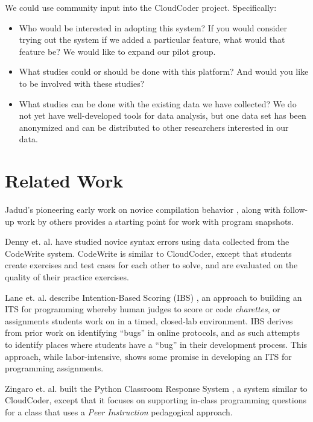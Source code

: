 \documentclass{sig-alternate}
\begin{document}
We could use community input into the CloudCoder project.  Specifically:

\begin{itemize}
\item Who would be interested in adopting this system?  If you would
  consider trying out the system if we added a particular feature,
  what would that feature be?  We would like
  to expand our pilot group.
\item What studies could or should be done with this platform?  And
  would you like to be involved with these studies?
\item What studies can be done with the existing data we have
  collected?  We do not yet have well-developed tools for data
  analysis, but one data set has been anonymized and can be
  distributed to other researchers interested in our data.
\end{itemize}

\section{Related Work}

Jadud's pioneering early work on novice compilation behavior
\cite{Jadud:2006:MTE:1151588.1151600}, along with follow-up work by
others \cite{Norris:2008:CCQ:1384271.1384284} provides a starting point for
work with program snapshots.

Denny et. al. have studied novice syntax errors
\cite{Denny:2012:SEE:2325296.2325318} using data collected from the CodeWrite system.
CodeWrite is similar to CloudCoder, except that students create
exercises and test cases for each other to solve, and are evaluated on
the quality of their practice exercises.

Lane et. al. describe Intention-Based Scoring (IBS) \cite{Lane:2005:ISA:1047344.1047471},
an approach to building an ITS for programming whereby human
judges to score or code {\em charettes}, or assignments students work on in a
timed, closed-lab environment.  IBS derives from prior work on
identifying ``bugs'' in online protocols, and as such attempts to
identify places where students have a ``bug'' in their development
process.  This approach, while labor-intensive, shows some promise in
developing an ITS for programming assignments.

Zingaro et. al. built the Python Classroom Response System
\cite{Zingaro:2013:FCP:2445196.2445369}, a system similar to
CloudCoder, except that it focuses on supporting in-class programming
questions for a class that uses a {\em Peer Instruction} pedagogical approach.
\end{document}
